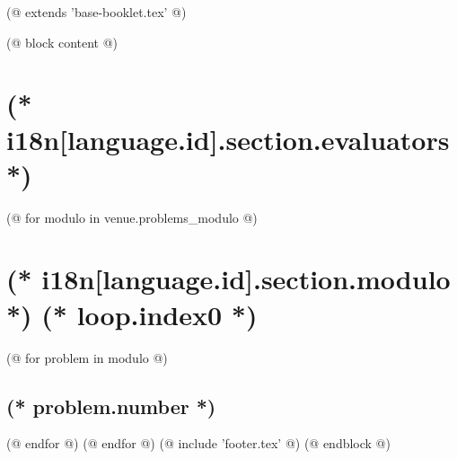 (@ extends 'base-booklet.tex' @)

(@ block content @)
    \thispagestyle{first}
    \afterpage{\globaldefs=1\restoregeometry}

    \vspace*{19mm}

    \section{(* i18n[language.id].section.evaluators *)}


    \pagestyle{answers}
    (@ for modulo in venue.problems_modulo @)
        \newpage%
        \section{(* i18n[language.id].section.modulo *) (* loop.index0 *)}
        (@ for problem in modulo @)%
            \setcounter{volume}{(* volume.number *)}%
            \setcounter{problem}{(* problem.number *)}%
            \subsection{(* problem.number *)}%
        (@ endfor @)
    (@ endfor @)
    (@ include 'footer.tex' @)
(@ endblock @)
